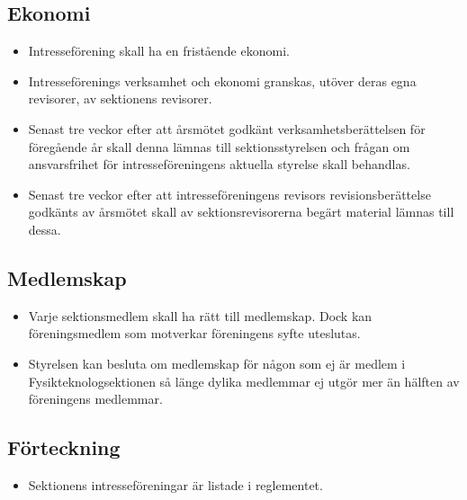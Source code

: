 \documentclass[11pt,a4paper]{article}
\begin{document}
\subsection{Ekonomi}

\begin{itemize}

  \item Intresseförening skall ha en fristående ekonomi.

  \item Intresseförenings verksamhet och ekonomi granskas, utöver deras egna revisorer, av
  sektionens revisorer.

  \item Senast tre veckor efter att årsmötet godkänt verksamhetsberättelsen för föregående år skall denna lämnas till sektionsstyrelsen och frågan om ansvarsfrihet för intresseföreningens aktuella styrelse skall behandlas.
  
  \item{Senast tre veckor efter att intresseföreningens revisors revisionsberättelse godkänts av årsmötet skall av sektionsrevisorerna begärt material lämnas till dessa.}

\end{itemize}

\subsection{Medlemskap}

\begin{itemize}

  \item Varje sektionsmedlem skall ha rätt till medlemskap. Dock kan
  förenings\-med\-lem som motverkar föreningens syfte uteslutas.
  
  \item Styrelsen kan besluta om medlemskap för någon som ej är medlem i Fysikteknologsektionen så länge dylika medlemmar ej utgör mer än hälften av föreningens medlemmar.
  

\end{itemize}

\subsection{Förteckning}

\begin{itemize}

  \item Sektionens intresseföreningar är listade i reglementet.

\end{itemize}
\end{document}
